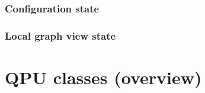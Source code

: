 \subsubsection{Configuration state}

\subsubsection{Local graph view state}

\section{QPU classes (overview)}
\label{sec:qpu_classes}




